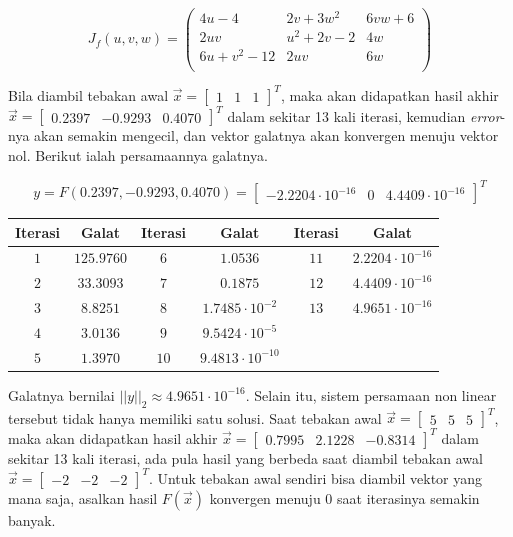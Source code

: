 \documentclass[11pt, a4paper, onecolumn, oneside, final]{report}
\begin{document}
$$
J_f(u,v,w) = 
\left(
\begin{array}{ccc}
 4 u-4 & 2 v+3 w^2 & 6 v w+6 \\
 2 u v & u^2+2 v-2 & 4 w \\
 6 u+v^2-12 & 2 u v & 6 w \\
\end{array}
\right)
$$

Bila diambil tebakan awal $\vec{x} = \begin{bmatrix}1 & 1 & 1 \end{bmatrix}^T$, maka akan didapatkan hasil akhir $\vec{x} = \begin{bmatrix}0.2397 & -0.9293 & 0.4070 \end{bmatrix}^T$ dalam sekitar 13 kali iterasi, kemudian \textit{error}-nya akan semakin mengecil, dan vektor galatnya akan konvergen menuju vektor nol. Berikut ialah persamaannya galatnya.

$$
y = F(0.2397, -0.9293, 0.4070) = 
\begin{bmatrix}
  -2.2204 \cdot 10^{-16}&
            0&
   4.4409 \cdot 10^{-16}
\end{bmatrix}^T
$$

\begin{table}[H]
\centering
\begin{tabular}{|c|c|c|c|c|c|}
\hline
\textbf{Iterasi} & \textbf{Galat} & \textbf{Iterasi} & \textbf{Galat} & \textbf{Iterasi} & \textbf{Galat} \\ \hline
$1$ & $125.9760$ & $6$ & $1.0536$ & $11$ & $2.2204 \cdot 10^{-16}$ \\ \hline
$2$ & $33.3093$ & $7$ & $0.1875$ & $12$ & $4.4409 \cdot 10^{-16}$ \\ \hline
$3$ & $8.8251$ & $8$ & $1.7485 \cdot 10^{-2}$ & $13$ & $4.9651 \cdot 10^{-16}$ \\ \hline
$4$ & $3.0136$ & $9$ & $9.5424 \cdot 10^{-5}$ &  & \\ \hline
$5$ & $1.3970$ & $10$ & $9.4813 \cdot 10^{-10}$ &  &  \\ \hline
\end{tabular}
\end{table}

Galatnya bernilai $||y||_2 \approx 4.9651 \cdot 10^{-16}$. Selain itu, sistem persamaan non linear tersebut tidak hanya memiliki satu solusi. Saat tebakan awal $\vec{x} = \begin{bmatrix}5 & 5 & 5 \end{bmatrix}^T$, maka akan didapatkan hasil akhir $\vec{x} = \begin{bmatrix}0.7995 & 2.1228 & -0.8314 \end{bmatrix}^T$ dalam sekitar 13 kali iterasi, ada pula hasil yang berbeda saat diambil tebakan awal $\vec{x} = \begin{bmatrix}-2 & -2 & -2 \end{bmatrix}^T$. Untuk tebakan awal sendiri bisa diambil vektor yang mana saja, asalkan hasil $F(\vec{x})$ konvergen menuju $0$ saat iterasinya semakin banyak.
\end{document}
